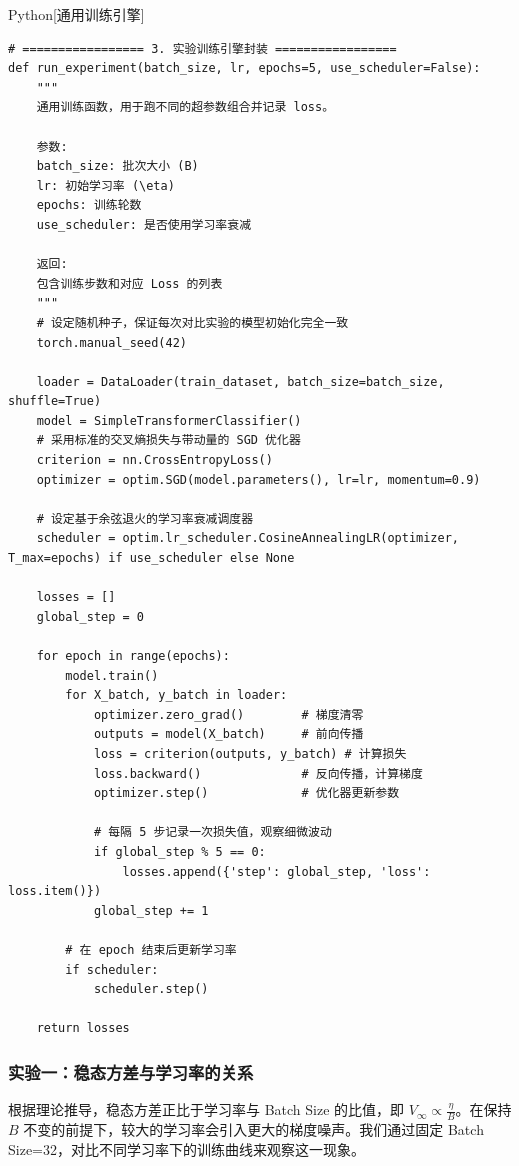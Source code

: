 \documentclass[10pt]{article}
\numberwithin{equation}{section}
\theoremstyle{plain}
\theoremstyle{definition}
\theoremstyle{remark}
\begin{document}
\begin{CodeBox}{Python}[通用训练引擎]
\begin{lstlisting}[style=PythonStyle]
# ================= 3. 实验训练引擎封装 =================
def run_experiment(batch_size, lr, epochs=5, use_scheduler=False):
    """
    通用训练函数，用于跑不同的超参数组合并记录 loss。
    
    参数:
    batch_size: 批次大小 (B)
    lr: 初始学习率 (\eta)
    epochs: 训练轮数
    use_scheduler: 是否使用学习率衰减
    
    返回:
    包含训练步数和对应 Loss 的列表
    """
    # 设定随机种子，保证每次对比实验的模型初始化完全一致
    torch.manual_seed(42)
    
    loader = DataLoader(train_dataset, batch_size=batch_size, shuffle=True)
    model = SimpleTransformerClassifier()
    # 采用标准的交叉熵损失与带动量的 SGD 优化器
    criterion = nn.CrossEntropyLoss()
    optimizer = optim.SGD(model.parameters(), lr=lr, momentum=0.9)
    
    # 设定基于余弦退火的学习率衰减调度器
    scheduler = optim.lr_scheduler.CosineAnnealingLR(optimizer, T_max=epochs) if use_scheduler else None

    losses = []
    global_step = 0
    
    for epoch in range(epochs):
        model.train()
        for X_batch, y_batch in loader:
            optimizer.zero_grad()        # 梯度清零
            outputs = model(X_batch)     # 前向传播
            loss = criterion(outputs, y_batch) # 计算损失
            loss.backward()              # 反向传播，计算梯度
            optimizer.step()             # 优化器更新参数
            
            # 每隔 5 步记录一次损失值，观察细微波动
            if global_step % 5 == 0:
                losses.append({'step': global_step, 'loss': loss.item()})
            global_step += 1
            
        # 在 epoch 结束后更新学习率
        if scheduler:
            scheduler.step()
            
    return losses
\end{lstlisting}
\end{CodeBox}

\subsubsection{实验一：稳态方差与学习率的关系}

根据理论推导，稳态方差正比于学习率与 Batch Size 的比值，即 $\displaystyle V_{\infty} \propto \frac{\eta}{B}$。在保持 $B$ 不变的前提下，较大的学习率会引入更大的梯度噪声。我们通过固定 Batch Size=32，对比不同学习率下的训练曲线来观察这一现象。
\end{document}
